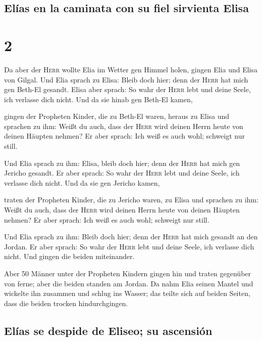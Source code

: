 \hypertarget{eluxedas-en-la-caminata-con-su-fiel-sirvienta-elisa}{%
\subsection{Elías en la caminata con su fiel sirvienta
Elisa}\label{eluxedas-en-la-caminata-con-su-fiel-sirvienta-elisa}}

\hypertarget{section-1}{%
\section{2}\label{section-1}}

 Da aber der \textsc{Herr} wollte Elia im Wetter gen
Himmel holen, gingen Elia und Elisa von Gilgal.  Und Elia
sprach zu Elisa: Bleib doch hier; denn der \textsc{Herr} hat mich gen
Beth-El gesandt. Elisa aber sprach: So wahr der \textsc{Herr} lebt und
deine Seele, ich verlasse dich nicht. Und da sie hinab gen Beth-El
kamen,

 gingen der Propheten Kinder, die zu Beth-El waren, heraus
zu Elisa und sprachen zu ihm: Weißt du auch, dass der \textsc{Herr} wird
deinen Herrn heute von deinen Häupten nehmen? Er aber sprach: Ich weiß
es auch wohl; schweigt nur still.

 Und Elia sprach zu ihm: Elisa, bleib doch hier; denn der
\textsc{Herr} hat mich gen Jericho gesandt. Er aber sprach: So wahr der
\textsc{Herr} lebt und deine Seele, ich verlasse dich nicht. Und da sie
gen Jericho kamen,

 traten der Propheten Kinder, die zu Jericho waren, zu
Elisa und sprachen zu ihm: Weißt du auch, dass der \textsc{Herr} wird
deinen Herrn heute von deinen Häupten nehmen? Er aber sprach: Ich weiß
es auch wohl; schweigt nur still.

 Und Elia sprach zu ihm: Bleib doch hier; denn der
\textsc{Herr} hat mich gesandt an den Jordan. Er aber sprach: So wahr
der \textsc{Herr} lebt und deine Seele, ich verlasse dich nicht. Und
gingen die beiden miteinander.

 Aber 50 Männer unter der Propheten Kindern gingen hin und
traten gegenüber von ferne; aber die beiden standen am Jordan.
 Da nahm Elia seinen Mantel und wickelte ihn zusammen und
schlug ins Wasser; das teilte sich auf beiden Seiten, dass die beiden
trocken hindurchgingen.

\hypertarget{eluxedas-se-despide-de-eliseo-su-ascensiuxf3n}{%
\subsection{Elías se despide de Eliseo; su
ascensión}\label{eluxedas-se-despide-de-eliseo-su-ascensiuxf3n}}

